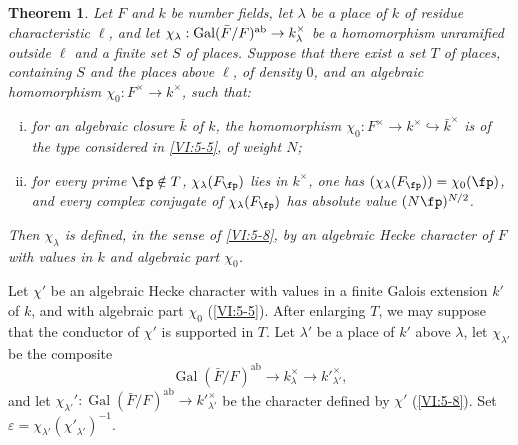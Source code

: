 \documentclass[12pt,oneside,english]{smfbook}
\DeclareMathOperator{\gal}{Gal}
\newcounter{char}
\newtheorem{theorem_}[subsection]{Theorem}
\begin{document}
\begin{theorem_}\label{VI:5-10}
Let $F$ and $k$ be number fields, let $\lambda$ be a place of $k$ of residue characteristic $\ell$, and let $\chi_\lambda:\gal(\bar F/F)^\textnormal{ab}\to k_\lambda^\times$ be a homomorphism unramified outside $\ell$ and a finite set $S$ of places. Suppose that there exist a set $T$ of places, containing $S$ and the places above $\ell$, of density $0$, and an algebraic homomorphism $\chi_0:F^\times\to k^\times$, such that:
\begin{enumerate}[(i)]
  \item for an algebraic closure $\bar k$ of $k$, the homomorphism $\chi_0:F^\times\to k^\times\hookrightarrow\bar k^\times$ is of the type considered in \ref{VI:5-5}, of weight $N$;
  \item for every prime $\fp\notin T$, $\chi_\lambda(F_\fp)$ lies in $k^\times$, one has $(\chi_\lambda(F_\fp))=\chi_0(\fp)$, and every complex conjugate of $\chi_\lambda(F_\fp)$ has absolute value $(N\fp)^{N/2}$.
\end{enumerate}

Then $\chi_\lambda$ is defined, in the sense of \ref{VI:5-8}, by an algebraic Hecke character of $F$ with values in $k$ and algebraic part $\chi_0$.
\end{theorem_}

Let $\chi'$ be an algebraic Hecke character with values in a finite Galois extension $k'$ of $k$, and with algebraic part $\chi_0$ (\ref{VI:5-5}). After enlarging $T$, we may suppose that the conductor of $\chi'$ is supported in $T$. Let $\lambda'$ be a place of $k'$ above $\lambda$, let $\chi_{\lambda'}$ be the composite
\[
  \gal(\bar F/F)^\mathrm{ab}\longrightarrow k_\lambda^\times
  \longrightarrow {k'}_{\lambda'}^\times,
\]
and let $\chi_{\lambda'}':\gal(\bar F/F)^\mathrm{ab}\to {k'}_{\lambda'}^\times$ be the character defined by $\chi'$ (\ref{VI:5-8}). Set $\varepsilon=\chi_{\lambda'}({\chi'}_{\lambda'})^{-1}$.
\end{document}
